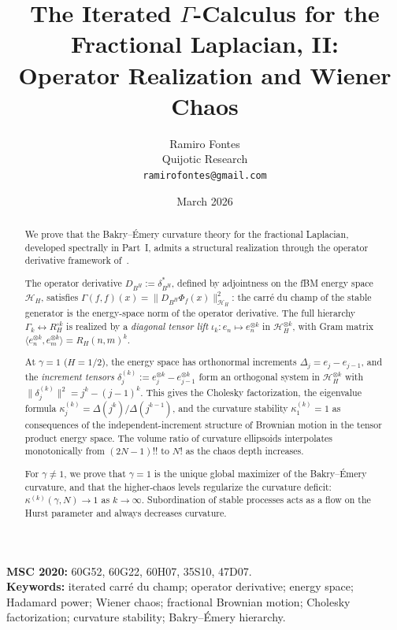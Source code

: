 \documentclass[11pt,a4paper]{article}
\title{The Iterated $\Gamma$-Calculus for the Fractional Laplacian, II:\\
Operator Realization and Wiener Chaos}
\author{Ramiro Fontes\\
Quijotic Research\\
\texttt{ramirofontes@gmail.com}}
\date{March 2026}
\theoremstyle{plain}
\theoremstyle{definition}
\theoremstyle{remark}
\newcommand{\HH}{\mathcal{H}_H}
\begin{document}
\maketitle

\begin{abstract}
We prove that the Bakry--\'Emery curvature theory for the
fractional Laplacian, developed spectrally in Part~I,
admits a structural realization through the operator
derivative framework of~\cite{Fontes2026opderiv}.

The operator derivative $D_{B^H} := \delta_{B^H}^*$,
defined by adjointness on the fBM energy space~$\HH$,
satisfies
$\Gamma(f,f)(x) = \|D_{B^H}\Phi_f(x)\|^2_{\HH}$:
the carr\'e du champ of the stable generator is the
energy-space norm of the operator derivative.
The full hierarchy $\Gamma_k \leftrightarrow R_H^{\circ k}$
is realized by a \emph{diagonal tensor lift}
$\iota_k\colon e_n \mapsto e_n^{\otimes k}$
in $\HH^{\otimes k}$, with Gram matrix
$\langle e_n^{\otimes k}, e_m^{\otimes k}\rangle
= R_H(n,m)^k$.

At $\gamma = 1$ ($H = 1/2$), the energy space has
orthonormal increments $\Delta_j = e_j - e_{j-1}$,
and the \emph{increment tensors}
$\delta_j^{(k)} := e_j^{\otimes k} - e_{j-1}^{\otimes k}$
form an orthogonal system in $\HH^{\otimes k}$ with
$\|\delta_j^{(k)}\|^2 = j^k - (j{-}1)^k$.
This gives the Cholesky factorization, the eigenvalue
formula $\kappa_j^{(k)} = \Delta(j^k)/\Delta(j^{k-1})$,
and the curvature stability $\kappa_1^{(k)} = 1$
as consequences of the independent-increment structure
of Brownian motion in the tensor product energy space.
The volume ratio of curvature ellipsoids interpolates
monotonically from $(2N{-}1)!!$ to $N!$ as the chaos
depth increases.

For $\gamma \neq 1$, we prove that $\gamma = 1$ is
the unique global maximizer of the Bakry--\'Emery
curvature, and that the higher-chaos levels regularize
the curvature deficit: $\kappa^{(k)}(\gamma,N) \to 1$
as $k \to \infty$.
Subordination of stable processes acts as a flow on
the Hurst parameter and always decreases curvature.
\end{abstract}

\medskip
\noindent\textbf{MSC 2020:} 60G52, 60G22, 60H07, 35S10, 47D07.\\
\textbf{Keywords:} iterated carr\'e du champ; operator derivative;
energy space; Hadamard power; Wiener chaos;
fractional Brownian motion; Cholesky factorization;
curvature stability; Bakry--\'Emery hierarchy.


\end{document}
